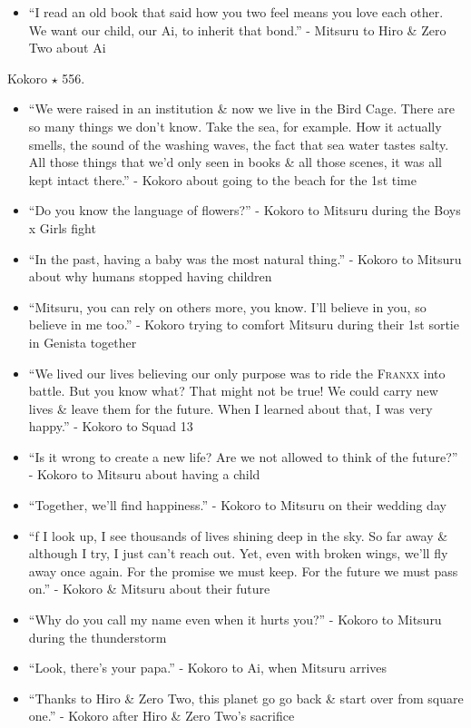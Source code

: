 \documentclass{article}
\begin{document}
\begin{enumerate}
\begin{itemize}
    	\item ``I read an old book that said how you two feel means you love each other. We want our child, our Ai, to inherit that bond.'' - Mitsuru to Hiro \& Zero Two about Ai
    \end{itemize}
    {\sc Kokoro $\star$ 556.}
    \begin{itemize}
    	\item ``We were raised in an institution \& now we live in the Bird Cage. There are so many things we don't know. Take the sea, for example. How it actually smells, the sound of the washing waves, the fact that sea water tastes salty. All those things that we'd only seen in books \& all those scenes, it was all kept intact there.'' - Kokoro about going to the beach for the 1st time
    	\item ``Do you know the language of flowers?'' - Kokoro to Mitsuru during the Boys x Girls fight
    	\item ``In the past, having a baby was the most natural thing.'' - Kokoro to Mitsuru about why humans stopped having children
    	\item ``Mitsuru, you can rely on others more, you know. I'll believe in you, so believe in me too.'' - Kokoro trying to comfort Mitsuru during their 1st sortie in Genista together
    	\item ``We lived our lives believing our only purpose was to ride the \textsc{Franxx} into battle. But you know what? That might not be true! We could carry new lives \& leave them for the future. When I learned about that, I was very happy.'' - Kokoro to Squad 13
    	\item ``Is it wrong to create a new life? Are we not allowed to think of the future?'' - Kokoro to Mitsuru about having a child
    	\item ``Together, we'll find happiness.'' - Kokoro to Mitsuru on their wedding day
    	\item ``f I look up, I see thousands of lives shining deep in the sky. So far away \& although I try, I just can't reach out. Yet, even with broken wings, we'll fly away once again. For the promise we must keep. For the future we must pass on.'' - Kokoro \& Mitsuru about their future
    	\item ``Why do you call my name even when it hurts you?'' - Kokoro to Mitsuru during the thunderstorm
    	\item ``Look, there's your papa.'' - Kokoro to Ai, when Mitsuru arrives
    	\item ``Thanks to Hiro \& Zero Two, this planet go go back \& start over from square one.'' - Kokoro after Hiro \& Zero Two's sacrifice

\end{itemize}
\end{enumerate}
\end{document}
